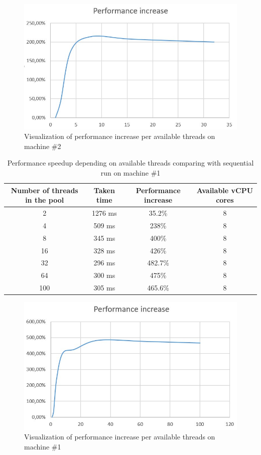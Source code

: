 \begin{figure}[h]
\centering\includegraphics[width=.8\textwidth]{img/exp/2/ubuntu-performance-increase}
\caption{Visualization of performance increase per available threads on machine \#2}  \label{img:ub-perf}
\end{figure}

\begin{table}[H]
\centering\caption{Performance speedup depending on available threads comparing with sequential run on machine \#1 \label{tab:comp-windows}}
\begin{tabular}{|c|c|c|c|}
\hline
\textbf{Number of threads in the pool} & \textbf{Taken time} & \textbf{Performance increase} & Available vCPU cores \\
\hline
2 & 1276 ms & 35.2\% & 8 \\
\hline
4 & 509 ms & 238\% & 8  \\
\hline
8 & 345 ms & 400\% & 8 \\
\hline
16 & 328 ms & 426\% & 8 \\
\hline
32 & 296 ms & 482.7\% & 8 \\
\hline
64 & 300 ms & 475\% & 8 \\
\hline
100 & 305 ms & 465.6\% & 8 \\
\hline
\end{tabular}
\end{table}

\begin{figure}[H]
\centering\includegraphics[width=.8\textwidth]{img/exp/2/windows-performance-increase}
\caption{Visualization of performance increase per available threads on machine \#1}  \label{img:win-perf}
\end{figure}

